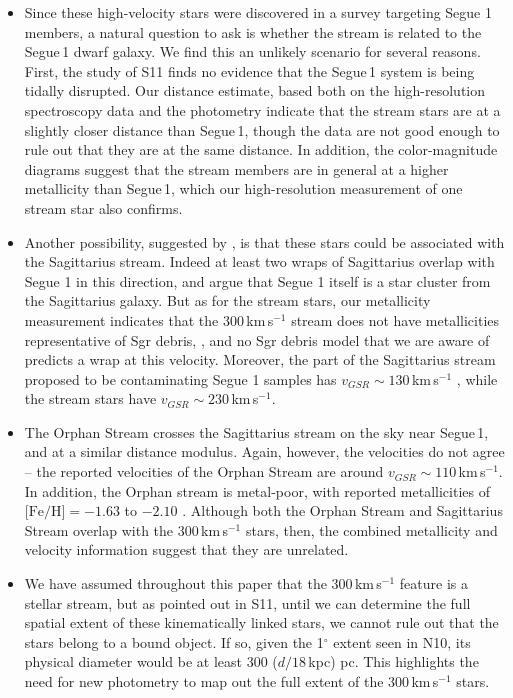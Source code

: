 \documentclass{emulateapj}
\begin{document}
\begin{itemize}
\item Since these high-velocity stars were discovered in a survey
  targeting Segue 1 members, a natural question to ask is whether the
  stream is related to the Segue\,1 dwarf galaxy. We find this an
  unlikely scenario for several reasons. First, the study of S11 finds
  no evidence that the Segue\,1 system is being tidally disrupted. Our
  distance estimate, based both on the high-resolution spectroscopy
  data and the photometry indicate that the stream stars are at a
  slightly closer distance than Segue\,1, though the data are not good
  enough to rule out that they are at the same distance. In addition,
  the color-magnitude diagrams suggest that the stream members are in
  general at a higher metallicity than Segue\,1, which our
  high-resolution measurement of one stream star also confirms.

\item Another possibility, suggested by \citet{Geha2009}, is that
  these stars could be associated with the Sagittarius stream. Indeed
  at least two wraps of Sagittarius overlap with Segue 1 in this
  direction, and \citet{Niederste-Ostholt2009} argue that Segue 1
  itself is a star cluster from the Sagittarius galaxy. But as for the
  stream stars, our metallicity measurement indicates that the
  300\,km\,s$^{-1}$ stream does not have metallicities representative
  of Sgr debris, \citep{Chou2007, Casey2012}, and no Sgr debris model
  that we are aware of predicts a wrap at this velocity. Moreover, the
  part of the Sagittarius stream proposed to be contaminating Segue 1
  samples has $v_{GSR} \sim 130$\,km\,s$^{-1}$
  \citep{Niederste-Ostholt2009}, while the stream stars have $v_{GSR}
  \sim 230$\,km\,s$^{-1}$.

\item The Orphan Stream \citep{Belokurov2007b} crosses the Sagittarius
  stream on the sky near Segue\,1, and at a similar distance
  modulus. Again, however, the velocities do not agree -- the reported
  velocities of the Orphan Stream are around $v_{GSR} \sim
  110$\,km\,s$^{-1}$. In addition, the Orphan stream is metal-poor,
  with reported metallicities of $\mbox{[Fe/H]} = -1.63$ to $-2.10$
  \citep{Newberg2010,casey13}. Although both the Orphan Stream and
  Sagittarius Stream overlap with the 300\,km\,s$^{-1}$ stars, then,
  the combined metallicity and velocity information suggest that they
  are unrelated.

\item We have assumed throughout this paper that the 300\,km\,s$^{-1}$
  feature is a stellar stream, but as pointed out in S11, until we can
  determine the full spatial extent of these kinematically linked
  stars, we cannot rule out that the stars belong to a bound
  object. If so, given the 1$^{\circ}$ extent seen in N10, its
  physical diameter would be at least 300 ($d / 18$\,kpc) pc. This
  highlights the need for new photometry to map out the full
  extent of the 300\,km\,s$^{-1}$ stars.


\end{itemize}
\end{document}
